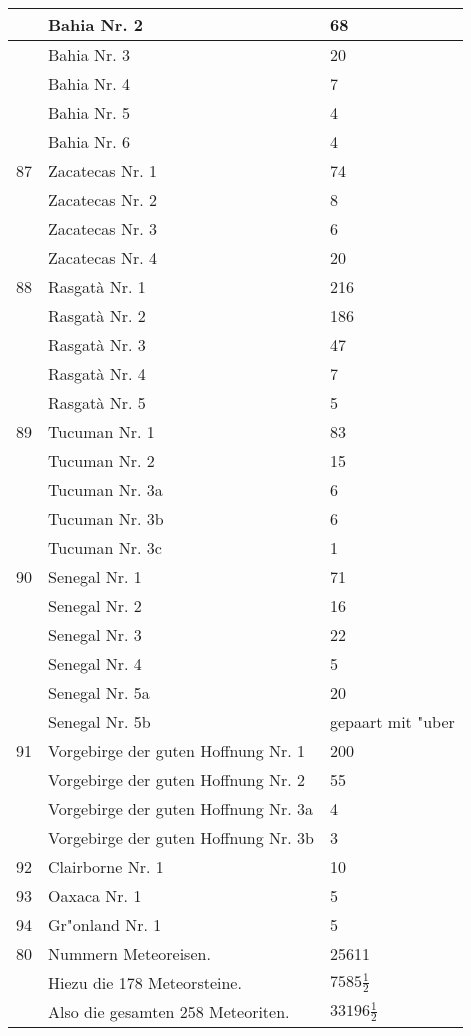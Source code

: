 \documentclass[a4paper, 11pt, oneside, polutonikogreek, german]{article}
\begin{document}
\begin{center}
\begin{longtable}{|l|l|l|}
          & Bahia Nr. 2 & 68 \\ \hline
          & Bahia Nr. 3 & 20 \\ \hline
          & Bahia Nr. 4 & 7 \\ \hline
          & Bahia Nr. 5 & 4 \\ \hline
          & Bahia Nr. 6 & 4 \\ \hline
        87 & Zacatecas Nr. 1 & 74 \\ \hline
          & Zacatecas Nr. 2 & 8 \\ \hline
          & Zacatecas Nr. 3 & 6 \\ \hline
          & Zacatecas Nr. 4 & 20 \\ \hline
        88 & Rasgatà Nr. 1 & 216 \\ \hline
          & Rasgatà Nr. 2 & 186 \\ \hline
          & Rasgatà Nr. 3 & 47 \\ \hline
          & Rasgatà Nr. 4 & 7 \\ \hline
          & Rasgatà Nr. 5 & 5 \\ \hline
        89 & Tucuman Nr. 1 & 83 \\ \hline
          & Tucuman Nr. 2 & 15 \\ \hline
          & Tucuman Nr. 3a & 6 \\ \hline
          & Tucuman Nr. 3b & 6 \\ \hline
          & Tucuman Nr. 3c & 1 \\ \hline
        90 & Senegal Nr. 1 & 71 \\ \hline
          & Senegal Nr. 2 & 16 \\ \hline
          & Senegal Nr. 3 & 22 \\ \hline
          & Senegal Nr. 4 & 5 \\ \hline
          & Senegal Nr. 5a & 20 \\ \hline
          & Senegal Nr. 5b & gepaart mit "uber \\ \hline
        91 & Vorgebirge der guten Hoffnung Nr. 1 & 200 \\ \hline
          & Vorgebirge der guten Hoffnung Nr. 2 & 55 \\ \hline
          & Vorgebirge der guten Hoffnung Nr. 3a & 4 \\ \hline
          & Vorgebirge der guten Hoffnung Nr. 3b & 3 \\ \hline
        92 & Clairborne Nr. 1 & 10 \\ \hline
        93 & Oaxaca Nr. 1 & 5 \\ \hline
        94 & Gr"onland Nr. 1 & 5 \\ \hline
        80 & Nummern Meteoreisen. & 25611 \\ \hline
          & Hiezu die 178 Meteorsteine. & $7585\frac{1}{2}$ \\ \hline
          & Also die gesamten 258 Meteoriten. & $33196\frac{1}{2}$ \\ \hline
    \end{longtable}
\end{center}
\clearpage
\end{document}
